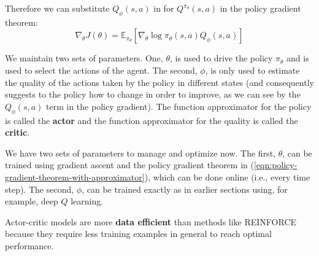 \documentclass[journal, onecolumn, 12pt, draftclsnofoot]{IEEEtran}
\newcommand{\kword}[1]{\textbf{#1}}
\begin{document}
		Therefore we can substitute $Q_\phi(s,a)$ in for $Q^{\pi_\theta}(s,a)$ in the policy gradient theorem:
		\begin{equation}
			\label{eqn:policy-gradient-theorem-with-approximator}
			\nabla_\theta J(\theta) = \mathbb{E}_{\pi_\theta} \left[ \nabla_\theta \log \pi_\theta (s, a) Q_\phi(s,a) \right]
		\end{equation}
		\par We maintain two sets of parameters. One, $\theta$, is used to drive the policy $\pi_\theta$ and is used to select the actions of the agent. The second, $\phi$, is only used to estimate the quality of the actions taken by the policy in different states (and consequently suggests to the policy how to change in order to improve, as we can see by the $Q_\phi(s,a)$ term in the policy gradient). The function approximator for the policy is called the \kword{actor} and the function approximator for the quality is called the \kword{critic}.
		\par We have two sets of parameters to manage and optimize now. The first, $\theta$, can be trained using gradient ascent and the policy gradient theorem in (\ref{eqn:policy-gradient-theorem-with-approximator}), which can be done online (i.e., every time step). The second, $\phi$, can be trained exactly as in earlier sections using, for example, deep $Q$ learning.
		\par Actor-critic models are more \kword{data efficient} than methods like REINFORCE because they require less training examples in general to reach optimal performance.
\end{document}
